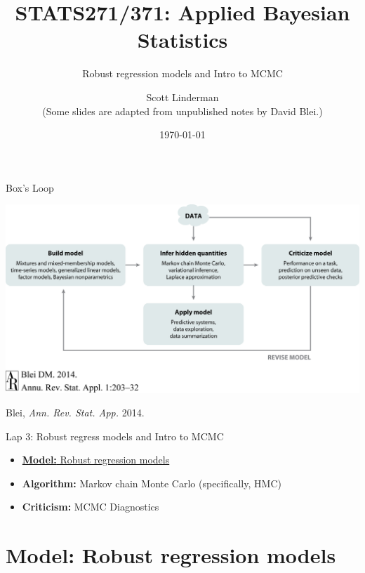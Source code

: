\documentclass[aspectratio=169]{beamer}
\title{STATS271/371: Applied Bayesian Statistics}
\subtitle{Robust regression models and Intro to MCMC}
\author{Scott Linderman
\\
{\footnotesize (Some slides are adapted from unpublished notes by David Blei.)}}
\date{\today}
\begin{document}
\maketitle


\begin{frame}{Box's Loop}
\begin{center}
\includegraphics[width=.85\linewidth]{figures/lap1/boxsloop.jpeg}\\
\end{center} 
\begin{flushright}
{\footnotesize Blei, \textit{Ann. Rev. Stat. App.} 2014.}
\end{flushright}
\end{frame}

\begin{frame}{Lap 3: Robust regress models and Intro to MCMC}
\begin{itemize}
    \item \hyperref[sec:robust_regression]{\textbf{Model:} Robust regression models}
    \item \textbf{Algorithm:} Markov chain Monte Carlo (specifically, HMC)
    \item \textbf{Criticism:} MCMC Diagnostics
\end{itemize}
\end{frame}


\section{Model: Robust regression models}
\label{sec:robust_regression}
\end{document}
